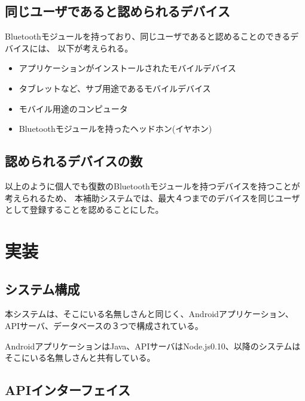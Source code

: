 \subsection{同じユーザであると認められるデバイス}

Bluetoothモジュールを持っており、同じユーザであると認めることのできるデバイスには、
以下が考えられる。

\begin{itemize}

\item アプリケーションがインストールされたモバイルデバイス

\item タブレットなど、サブ用途であるモバイルデバイス

\item モバイル用途のコンピュータ

\item Bluetoothモジュールを持ったヘッドホン(イヤホン)

\end{itemize}

\subsection{認められるデバイスの数}

以上のように個人でも復数のBluetoothモジュールを持つデバイスを持つことが考えられるため、
本補助システムでは、最大４つまでのデバイスを同じユーザとして登録することを認めることにした。


\newpage

\section{実装}

\subsection{システム構成}

本システムは、そこにいる名無しさんと同じく、Androidアプリケーション、APIサーバ、データベースの３つで構成されている。

AndroidアプリケーションはJava、APIサーバはNode.js0.10、以降のシステムはそこにいる名無しさんと共有している。

\subsection{APIインターフェイス}

